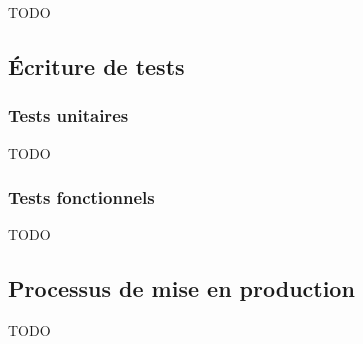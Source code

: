 TODO

\subsection{Écriture de tests}

\subsubsection{Tests unitaires}

TODO

\subsubsection{Tests fonctionnels}

TODO

\subsection{Processus de mise en production}

TODO
